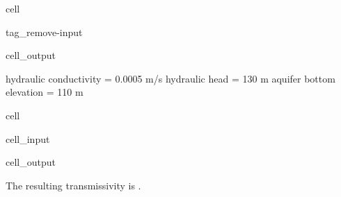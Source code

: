 \documentclass[letterpaper,10pt,english]{jupyterBook}
\begin{document}
\begin{sphinxuseclass}{cell}
\begin{sphinxuseclass}{tag_remove-input}\begin{sphinxVerbatimOutput}

\begin{sphinxuseclass}{cell_output}
\begin{sphinxVerbatim}[commandchars=\\\{\}]

hydraulic conductivity = 0.0005 m/s
hydraulic head = 130 m
aquifer bottom elevation = 110 m
\end{sphinxVerbatim}

\end{sphinxuseclass}\end{sphinxVerbatimOutput}

\end{sphinxuseclass}
\end{sphinxuseclass}
\begin{sphinxuseclass}{cell}\begin{sphinxVerbatimInput}

\begin{sphinxuseclass}{cell_input}
\begin{sphinxVerbatim}[commandchars=\\\{\}]
   
   
   

  
\PYG{l+s+s2}{[1mSolution:}\PYG{l+s+s2}{[0m}\PYG{l+s+s2}{[1m}\PYG{l+s+s2}{[0m.}
\end{sphinxVerbatim}

\end{sphinxuseclass}\end{sphinxVerbatimInput}
\begin{sphinxVerbatimOutput}

\begin{sphinxuseclass}{cell_output}
\begin{sphinxVerbatim}[commandchars=\\\{\}]
The resulting transmissivity is .
\end{sphinxVerbatim}

\end{sphinxuseclass}\end{sphinxVerbatimOutput}

\end{sphinxuseclass}
\end{document}
